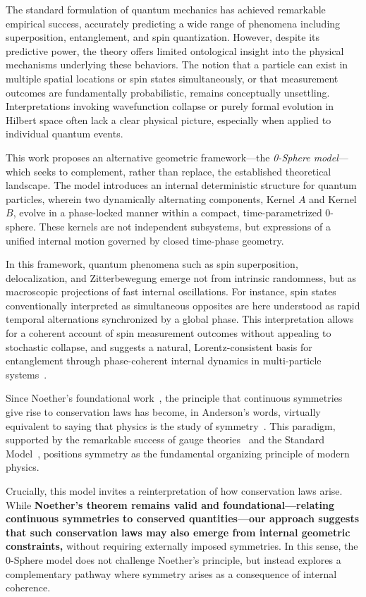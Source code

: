 \documentclass[%
 reprint,
 amsmath,amssymb,
 aps,
]{revtex4-1}
\numberwithin{equation}{section}%
\begin{document}
The standard formulation of quantum mechanics has achieved remarkable empirical success, accurately predicting a wide range of phenomena including superposition, entanglement, and spin quantization. However, despite its predictive power, the theory offers limited ontological insight into the physical mechanisms underlying these behaviors. The notion that a particle can exist in multiple spatial locations or spin states simultaneously, or that measurement outcomes are fundamentally probabilistic, remains conceptually unsettling. Interpretations invoking wavefunction collapse or purely formal evolution in Hilbert space often lack a clear physical picture, especially when applied to individual quantum events.

This work proposes an alternative geometric framework—the \emph{0-Sphere model}—which seeks to complement, rather than replace, the established theoretical landscape. The model introduces an internal deterministic structure for quantum particles, wherein two dynamically alternating components, Kernel $A$ and Kernel $B$, evolve in a phase-locked manner within a compact, time-parametrized 0-sphere. These kernels are not independent subsystems, but expressions of a unified internal motion governed by closed time-phase geometry.

In this framework, quantum phenomena such as spin superposition, delocalization, and Zitterbewegung emerge not from intrinsic randomness, but as macroscopic projections of fast internal oscillations. For instance, spin states conventionally interpreted as simultaneous opposites are here understood as rapid temporal alternations synchronized by a global phase. This interpretation allows for a coherent account of spin measurement outcomes without appealing to stochastic collapse, and suggests a natural, Lorentz-consistent basis for entanglement through phase-coherent internal dynamics in multi-particle systems~\cite{einstein1905}.

Since Noether's foundational work~\cite{noether1918}, the principle that continuous symmetries give rise to conservation laws has become, in Anderson's words, virtually equivalent to saying that physics is the study of symmetry~\cite{anderson1972}. This paradigm, supported by the remarkable success of gauge theories~\cite{weinberg1996} and the Standard Model~\cite{gross1996}, positions symmetry as the fundamental organizing principle of modern physics.

Crucially, this model invites a reinterpretation of how conservation laws arise. While \textbf{Noether’s theorem remains valid and foundational—relating continuous symmetries to conserved quantities—our approach suggests that such conservation laws may also emerge from internal geometric constraints,} without requiring externally imposed symmetries. In this sense, the 0-Sphere model does not challenge Noether’s principle, but instead explores a complementary pathway where symmetry arises as a consequence of internal coherence.
\end{document}
